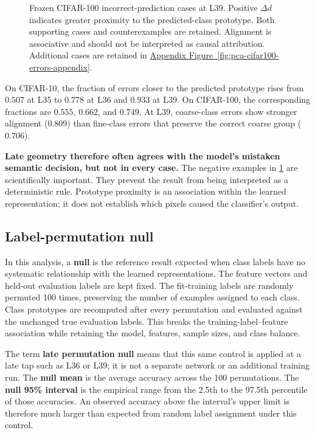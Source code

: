 \begin{figure}[!htbp]
    \centering
    \caption{Frozen CIFAR-100 incorrect-prediction cases at L39. Positive
    $\Delta d$ indicates greater proximity to the predicted-class prototype.
    Both supporting cases and counterexamples are retained. Alignment is
    associative and should not be interpreted as causal attribution. Additional
    cases are retained in
    \hyperref[fig:pca-cifar100-errors-appendix]{Appendix Figure~\ref*{fig:pca-cifar100-errors-appendix}}.}
    \label{fig:pca-cifar100-errors}
\end{figure}



On CIFAR-10, the fraction of errors closer to the predicted prototype rises
from $0.507$ at L35 to $0.778$ at L36 and $0.933$ at L39. On CIFAR-100, the
corresponding fractions are $0.555$, $0.662$, and $0.749$. At L39, coarse-class
errors show stronger alignment ($0.809$) than fine-class errors that preserve
the correct coarse group ($0.706$).

\textbf{Late geometry therefore often agrees with the model's mistaken
semantic decision, but not in every case.} The negative examples in
\cref{fig:pca-cifar100-errors} are scientifically important. They prevent the
result from being interpreted as a deterministic rule. Prototype proximity is
an association within the learned representation; it does not establish which
pixels caused the classifier's output.

\subsection{Label-permutation null}

In this analysis, a \textbf{null} is the reference result expected when class
labels have no systematic relationship with the learned representations. The
feature vectors and held-out evaluation labels are kept fixed. The
fit-training labels are randomly permuted 100 times, preserving the number of
examples assigned to each class. Class prototypes are recomputed after every
permutation and evaluated against the unchanged true evaluation labels. This
breaks the training-label--feature association while retaining the model,
features, sample sizes, and class balance.

The term \textbf{late permutation null} means that this same control is applied
at a late tap such as L36 or L39; it is not a separate network or an additional
training run. The \textbf{null mean} is the average accuracy across the 100
permutations. The \textbf{null 95\% interval} is the empirical range from the
2.5th to the 97.5th percentile of those accuracies. An observed accuracy above
the interval's upper limit is therefore much larger than expected from random
label assignment under this control.

